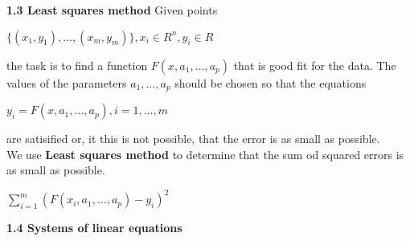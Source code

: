 \documentclass{article}
\begin{document}
\begin{multicols}{2}
\textbf{1.3 Least squares method}
Given points
\begin{center}
    \begin{math}
        \{ (x_1, y_1), \dots, (x_m, y_m) \}, x_i \in R^n , y_i \in R
    \end{math}
\end{center}
the task is to find a function $F(x, a_1, \dots, a_p)$ that is good fit for the data.
The values of the parameters $a_1, \dots, a_p$ should be chosen so that the equations
\begin{center}
    \begin{math}
        y_i = F(x, a_1, \dots, a_p), i=1,\dots,m
    \end{math}
\end{center} are satisified or, it this is not possible, that the error is as small as possible.\\
We use \textbf{Least squares method} to determine that the sum od squared errors is as small as possible.
\begin{center}
    \begin{math}
        \sum_{i=1}^m (F(x_i, a_1, \dots, a_p) - y_i)^2
    \end{math}
\end{center}

\textbf{1.4 Systems of linear equations}


\end{multicols}
\end{document}
